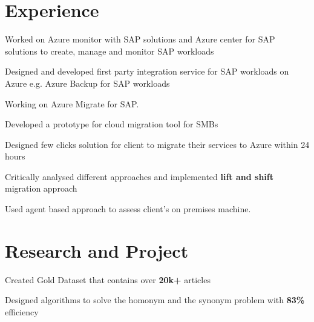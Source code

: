 \documentclass[a4paper]{deedy-resume-openfont}
\begin{document}
\hfill
\begin{minipage}[t]{0.63\textwidth} 

\section{Experience}
\vspace{\topsep}
\begin{tightemize}
\item Worked on Azure monitor with SAP solutions and Azure center for SAP solutions to create, manage and monitor SAP workloads 
\item Designed and developed first party integration service for SAP workloads on Azure e.g. Azure Backup for SAP workloads
\item Working on Azure Migrate for SAP.
\end{tightemize}

\vspace{\topsep}
\begin{tightemize}
\item Developed a prototype for cloud migration tool for SMBs
\item Designed few clicks solution for client to migrate their services to Azure within 24 hours
\item Critically analysed different approaches and implemented \textbf{lift and shift} migration approach
\item Used agent based approach to assess client's on premises machine.
\end{tightemize}

\section{Research and Project}

\begin{tightemize}
\item Created Gold Dataset that contains over \textbf{20k+} articles
\item Designed algorithms to solve the homonym and the synonym problem with \textbf{83\%} efficiency
\end{tightemize}
\sectionsep


\end{minipage}
\end{document}
